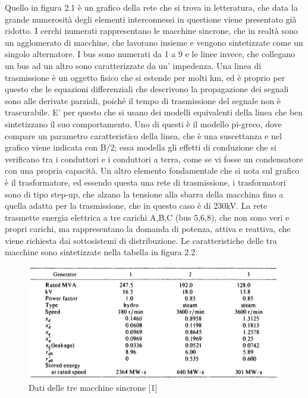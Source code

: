 \documentclass[Lau,noexaminfo]{sapthesis}
\begin{document}
	Quello in figura 2.1 è un grafico della rete che si trova in letteratura, che data la grande numerosità degli elementi interconnessi in questione viene presentato già ridotto. I cerchi numerati rappresentano le macchine sincrone, che in realtà sono un agglomerato di macchine, che lavorano insieme e vengono sintetizzate come un singolo alternatore. I bus sono numerati da 1 a 9 e le linee invece, che collegano un bus ad un altro sono caratterizzate da un' impedenza. Una linea di trasmissione è un oggetto fisico che si estende per molti km, ed è proprio per questo che le equazioni differenziali che descrivono la propagazione dei segnali sono alle derivate parziali, poiché il tempo di trasmissione del segnale non è trascurabile. E' per questo che si usano dei modelli equivalenti della linea che ben sintetizzano il suo comportamento. Uno di questi è il modello pi-greco, dove compare un parametro caratteristico della linea, che è una suscettanza e nel grafico viene indicata con B/2; essa modella gli effetti di conduzione che si verificano tra i conduttori e i conduttori a terra, come se vi fosse un condensatore con una propria capacità. Un altro elemento fondamentale che si nota sul grafico è il trasformatore, ed essendo questa una rete di trasmissione, i trasformatori sono di tipo step-up, che alzano la tensione alla sbarra della macchina fino a quella adatta per la trasmissione, che in questo caso è di 230kV. La rete trasmette energia elettrica a tre carichi A,B,C (bus 5,6,8), che non sono veri e propri carichi, ma rappresentano la domanda di potenza, attiva e reattiva, che viene richiesta dai sottosistemi di distribuzione. Le caratteristiche delle tra macchine sono sintetizzate nella tabella in figura 2.2.
	\begin{figure}
		\centering
		\includegraphics[height=0.25\textheight]{macchineWSCC}
		\caption{Dati delle tre macchine sincrone [1]}
	\end{figure}
\end{document}
